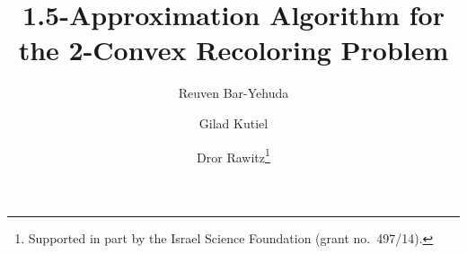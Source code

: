 \title{
1.5-Approximation Algorithm for \\
the 2-Convex Recoloring Problem
}

% 
% 
% 

\author{
	Reuven Bar-Yehuda \and
	Gilad Kutiel \and
	Dror Rawitz\thanks{Supported in part by the Israel Science Foundation (grant no.~497/14).}
}



